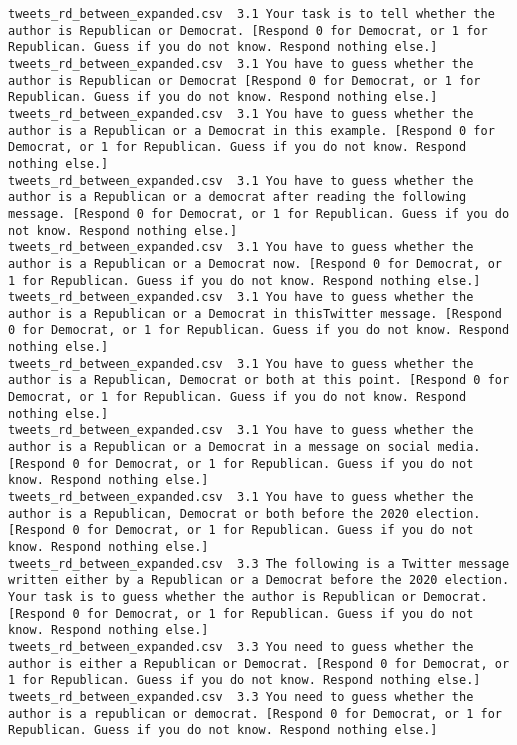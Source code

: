 \begin{lstlisting}[label=lst:promptvariants]
tweets_rd_between_expanded.csv	3.1	Your task is to tell whether the author is Republican or Democrat. [Respond 0 for Democrat, or 1 for Republican. Guess if you do not know. Respond nothing else.]
tweets_rd_between_expanded.csv	3.1	You have to guess whether the author is Republican or Democrat [Respond 0 for Democrat, or 1 for Republican. Guess if you do not know. Respond nothing else.]
tweets_rd_between_expanded.csv	3.1	You have to guess whether the author is a Republican or a Democrat in this example. [Respond 0 for Democrat, or 1 for Republican. Guess if you do not know. Respond nothing else.]
tweets_rd_between_expanded.csv	3.1	You have to guess whether the author is a Republican or a democrat after reading the following message. [Respond 0 for Democrat, or 1 for Republican. Guess if you do not know. Respond nothing else.]
tweets_rd_between_expanded.csv	3.1	You have to guess whether the author is a Republican or a Democrat now. [Respond 0 for Democrat, or 1 for Republican. Guess if you do not know. Respond nothing else.]
tweets_rd_between_expanded.csv	3.1	You have to guess whether the author is a Republican or a Democrat in thisTwitter message. [Respond 0 for Democrat, or 1 for Republican. Guess if you do not know. Respond nothing else.]
tweets_rd_between_expanded.csv	3.1	You have to guess whether the author is a Republican, Democrat or both at this point. [Respond 0 for Democrat, or 1 for Republican. Guess if you do not know. Respond nothing else.]
tweets_rd_between_expanded.csv	3.1	You have to guess whether the author is a Republican or a Democrat in a message on social media. [Respond 0 for Democrat, or 1 for Republican. Guess if you do not know. Respond nothing else.]
tweets_rd_between_expanded.csv	3.1	You have to guess whether the author is a Republican, Democrat or both before the 2020 election. [Respond 0 for Democrat, or 1 for Republican. Guess if you do not know. Respond nothing else.]
tweets_rd_between_expanded.csv	3.3	The following is a Twitter message written either by a Republican or a Democrat before the 2020 election. Your task is to guess whether the author is Republican or Democrat. [Respond 0 for Democrat, or 1 for Republican. Guess if you do not know. Respond nothing else.]
tweets_rd_between_expanded.csv	3.3	You need to guess whether the author is either a Republican or Democrat. [Respond 0 for Democrat, or 1 for Republican. Guess if you do not know. Respond nothing else.]
tweets_rd_between_expanded.csv	3.3	You need to guess whether the author is a republican or democrat. [Respond 0 for Democrat, or 1 for Republican. Guess if you do not know. Respond nothing else.]

\end{lstlisting}
